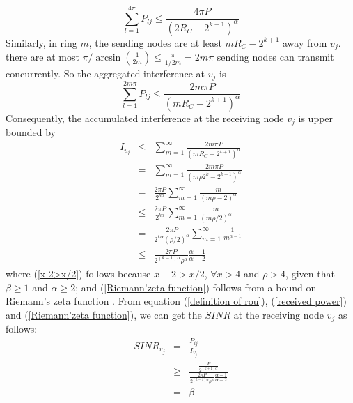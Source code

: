 \documentclass[conference]{IEEEtran}
\begin{document}
\begin{IEEEproof}
\begin{displaymath}
   \sum_{l=1}^{4\pi} P_{lj} \leq{\frac{4\pi P}{(2R_C-2^{k+1})^\alpha}}
\end{displaymath}
Similarly, in ring $m$, the sending nodes are at least
$mR_C-2^{k+1}$ away from $v_j$. there are at most $\pi
/\arcsin(\frac{1}{2m})\leq \frac{\pi}{1/2m}=2m\pi$ sending nodes can
transmit concurrently. So the aggregated interference at $v_j$ is
\begin{displaymath} \label{interference in annular area m}
   \sum_{l=1}^{2m \pi} P_{lj} \leq{\frac{2m\pi P}{(mR_C-2^{k+1})^\alpha}}
\end{displaymath}
Consequently, the accumulated interference at the receiving node
$v_j$ is upper bounded by
\begin{eqnarray}\label{total interference}
I_{v_j} &\leq &\sum_{m=1}^{\infty} \frac{2m\pi P}{(mR_C-2^{k+1})^\alpha}\nonumber \\
        &=&\sum_{m=1}^{\infty} \frac{2m\pi P}{(m\rho 2^k-2^{k+1})^\alpha}\nonumber \\
        &=&\frac{2\pi P}{2^{k\alpha}}\sum_{m=1}^{\infty} {\frac{m}{(m\rho -2)^\alpha}} \label{x-2>x/2}\\
        &\leq &\frac{2\pi P}{2^{k\alpha}}\sum_{m=1}^{\infty} {\frac{m}{(m\rho /2)^\alpha}} \nonumber\\
        &=&\frac{2\pi P}{2^{k\alpha}(\rho /2)^\alpha}\sum_{m=1}^{\infty} {\frac{1}{m^{\alpha-1}}}\nonumber \\
        &\leq &\frac{2\pi
        P}{2^{(k-1)\alpha}\rho^\alpha}\frac{\alpha-1}{\alpha-2}\label{Riemann'zeta function}
\end{eqnarray}
where (\ref{x-2>x/2}) follows because $x-2>x/2$, $\forall x>4$ and
$\rho
>4$, given that $\beta \geq 1$ and $\alpha \geq 2$; and (\ref{Riemann'zeta function}) follows
from a bound on Riemann's zeta function
\cite{goussevskaia2007complexity}. From equation (\ref{definition of
rou}), (\ref{received power}) and (\ref{Riemann'zeta function}), we
can get the $SINR$ at the receiving node $v_j$ as follows:
\begin{eqnarray}\label{SINR}
SINR_{v_j} &=&\frac{P_{ij}}{I_{v_j}}\nonumber \\
           &\geq &\frac{\frac{P}{2^{(k+1)\alpha}}}{\frac{2\pi P}{2^{(k-1)\alpha}\rho ^\alpha}\frac{\alpha-1}{\alpha-2}}\nonumber \\
           &=&\beta \nonumber
\end{eqnarray}

\end{IEEEproof}
\end{document}
